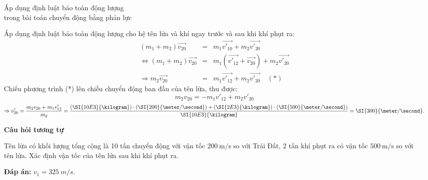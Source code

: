 \begin{dang}{Áp dụng định luật bảo toàn động lượng \\trong bài toán chuyển động bằng phản lực}
{		Áp dụng định luật bảo toàn động lượng cho hệ tên lửa và khí ngay trước và sau khi khí phụt ra:
	\begin{eqnarray*}
		\left(m_1+m_2\right)\overrightarrow{v_{20}}&=&m_1\overrightarrow{v'_{10}}+m_2\overrightarrow{v'_{20}}\\
		\Leftrightarrow \left(m_1+m_2\right)\overrightarrow{v_{20}}&=&m_1\left(\overrightarrow{v'_{12}}+\overrightarrow{v_{20}}\right)+m_2\overrightarrow{v'_{20}}\\
		\Rightarrow m_2\overrightarrow{v_{20}}&=&m_1\overrightarrow{v'_{12}}+m_2\overrightarrow{v'_{20}} \quad (*)
	\end{eqnarray*}
	Chiếu phương trình (*) lên chiều chuyển động ban đầu của tên lửa, thu được:
	$$m_2v_{20}=-m_1v'_{12}+m_2v'_{20}$$
	$$\Rightarrow v'_{20}=\dfrac{m_2v_{20}+m_1v'_{12}}{m_2}=\dfrac{\left(\SI{10E3}{\kilogram}\right)\cdot\left(\SI{200}{\meter/\second}\right)+\left(\SI{2E3}{\kilogram}\right)\cdot\left(\SI{500}{\meter/\second}\right)}{\SI{10E3}{\kilogram}}=\SI{300}{\meter/\second}.$$
		\begin{center}
			\textbf{Câu hỏi tương tự}
		\end{center}
		
		Tên lửa có khối lượng tổng cộng là 10 tấn chuyển động với vận tốc $\SI{200}{\meter/\second}$ so với Trái Đất, 2 tấn khí phụt ra có vận tốc $\SI{500}{\meter/\second}$ so với tên lửa. Xác định vận tốc của tên lửa sau khi khí phụt ra.
		
		\textbf{Đáp án:} $v_1  =\SI{325}{m/s}$.
	}
\end{dang}
